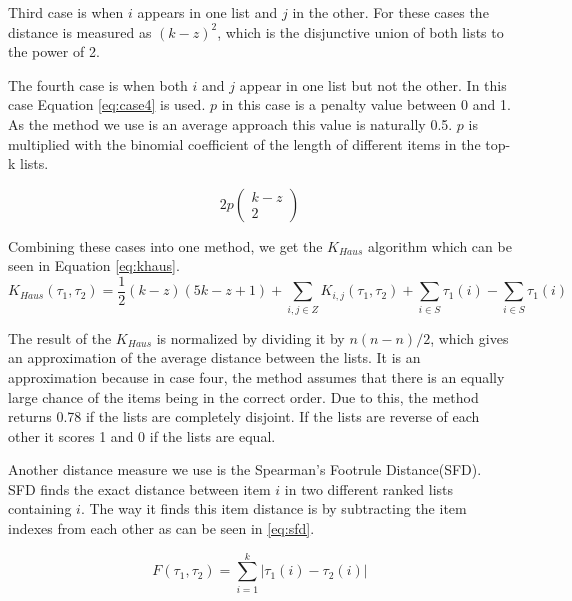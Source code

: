 Third case is when $i$ appears in one list and $j$ in the other. For these cases the distance is measured as $(k-z)^2$, which is the disjunctive union of both lists to the power of 2.

The fourth case is when both $i$ and $j$ appear in one list but not the other. In this case Equation \ref{eq:case4} is used. $p$ in this case is a penalty value between 0 and 1. As the method we use is an average approach this value is naturally 0.5. $p$ is multiplied with the binomial coefficient of the length of different items in the top-k lists.

\begin{equation}\label{eq:case4}
2p\left(\!
    \begin{array}{c}
      k-z \\
      2
    \end{array}
  \!\right)
\end{equation}


Combining these cases into one method, we get the $K_{Haus}$ algorithm which can be seen in Equation \ref{eq:khaus}. 
\footnotesize
\begin{equation}\label{eq:khaus}
K_{Haus}(\tau_1,\tau_2) = \frac{1}{2}(k-z)(5k-z+1)+ \sum_{i,j \in Z} K_{i,j}(\tau_1,\tau_2) + \sum_{i \in S}\tau_1(i) - \sum_{i \in S}\tau_1(i)
\end{equation}
\normalsize

The result of the $K_{Haus}$ is normalized by dividing it by $n(n-n)/2$, which gives an approximation of the average distance between the lists. It is an approximation because in case four, the method assumes that there is an equally large chance of the items being in the correct order. Due to this, the method returns 0.78 if the lists are completely disjoint. If the lists are reverse of each other it scores 1 and 0 if the lists are equal. %

 

Another distance measure we use is the Spearman's Footrule Distance(SFD). SFD finds the exact distance between item $i$ in two different ranked lists containing $i$. The way it finds this item distance is by subtracting the item indexes from each other as can be seen in \ref{eq:sfd}. 

\begin{equation}\label{eq:sfd}
F(\tau_1, \tau_2) = \sum_{i=1}^{k} | \tau_1 (i) - \tau_2 (i) |
\end{equation}

